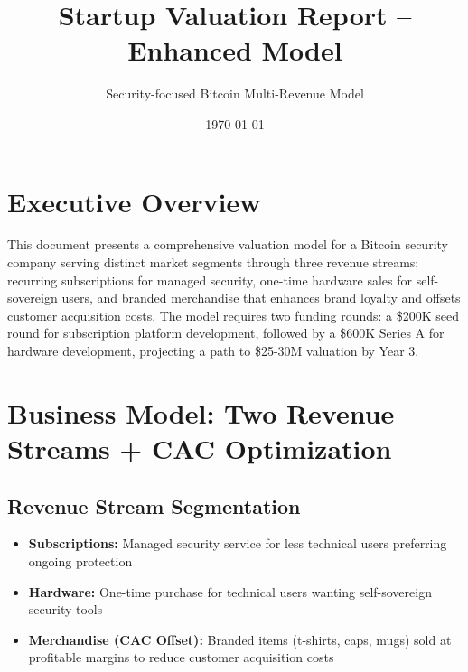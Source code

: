 \documentclass[11pt]{article}
\begin{document}
\title{Startup Valuation Report -- Enhanced Model}
\author{Security-focused Bitcoin Multi-Revenue Model}
\date{\today}
\maketitle

\section*{Executive Overview}
This document presents a comprehensive valuation model for a Bitcoin security company serving distinct market segments through three revenue streams: recurring subscriptions for managed security, one-time hardware sales for self-sovereign users, and branded merchandise that enhances brand loyalty and offsets customer acquisition costs. The model requires two funding rounds: a \$200K seed round for subscription platform development, followed by a \$600K Series A for hardware development, projecting a path to \$25-30M valuation by Year 3.

\section{Business Model: Two Revenue Streams + CAC Optimization}

\subsection{Revenue Stream Segmentation}
\begin{itemize}
  \item \textbf{Subscriptions:} Managed security service for less technical users preferring ongoing protection
  \item \textbf{Hardware:} One-time purchase for technical users wanting self-sovereign security tools
  \item \textbf{Merchandise (CAC Offset):} Branded items (t-shirts, caps, mugs) sold at profitable margins to reduce customer acquisition costs
\end{itemize}
\end{document}
